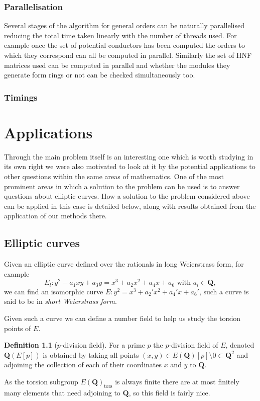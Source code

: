 \documentclass[a4paper,abstracton,bibtotoc]{scrreprt}
\theoremstyle{definition}
\newtheorem{defn}{Definition}
\newcommand{\QQ}{\mathbf{Q}}
\begin{document}
\subsection{Parallelisation}
Several stages of the algorithm for general orders can be naturally parallelised reducing the total time taken linearly with the number of threads used.
For example once the set of potential conductors has been computed the orders to which they correspond can all be computed in parallel.
Similarly the set of HNF matrices used can be computed in parallel and whether the modules they generate form rings or not can be checked simultaneously too.

\subsection{Timings}

\chapter{Applications}

Through the main problem itself is an interesting one which is worth studying in its own right we were also motivated to look at it by the potential applications to other questions within the same areas of mathematics.
One of the most prominent areas in which a solution to the problem can be used is to answer questions about elliptic curves.
How a solution to the problem considered above can be applied in this case is detailed below, along with results obtained from the application of our methods there.

\section{Elliptic curves}
\label{sec:ell}
Given an elliptic curve defined over the rationals in long Weierstrass form, for example
\[E_l \colon y^2 + a_1xy + a_3y = x^3 + a_2x^2 + a_4x + a_6\text{ with }a_i \in \QQ,\]
we can find an isomorphic curve $E \colon y^2 = x^3 + a_2'x^2 + a_4'x + a_6'$, such a curve is said to be in \emph{short Weierstrass form}.

Given such a curve we can define a number field to help us study the torsion points of $E$.
\begin{defn}[$p$-division field]
For a prime $p$ the $p$-division field of $E$, denoted $\QQ(E[p])$ is obtained by taking all points $(x,y) \in E(\QQ)[p]\setminus 0\subset \QQ^2$ and adjoining the collection of each of their coordinates $x$ and $y$ to $\QQ$.
\end{defn}
As the torsion subgroup $E(\QQ)_\text{tors}$ is always finite there are at most finitely many elements that need adjoining to $\QQ$, so this field is fairly nice.
\end{document}
